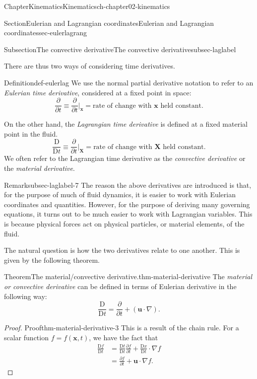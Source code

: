 \documentclass[oneside,10pt,]{book}
\numberwithin{equation}{section}
\newcommand{\DD}[2]{\frac{\mathrm{D}#1}{\mathrm{D}#2}}
\newcommand{\pd}[2]{\frac{\partial#1}{\partial#2}}
\newcommand{\bx}{\boldsymbol{x}}
\newcommand{\bX}{\boldsymbol{X}}
\newcommand{\bu}{\boldsymbol{u}}
\begin{document}
\begin{chapterptx}{Chapter}{Kinematics}{}{Kinematics}{}{}{ch-chapter02-kinematics}
\begin{sectionptx}{Section}{Eulerian and Lagrangian coordinates}{}{Eulerian and Lagrangian coordinates}{}{}{sec-eulerlagrang}
\begin{subsectionptx}{Subsection}{The convective derivative}{}{The convective derivative}{}{}{subsec-laglabel}
\par
There are thus two ways of considering time derivatives.%
\begin{definition}{Definition}{}{}{def-eulerlag}%
We use the normal partial derivative notation to refer to an \emph{Eulerian time derivative}, considered at a fixed point in space:%
\begin{equation*}
\pd{}{t} \equiv \pd{}{t} \biggr\rvert_{\bx} = \text{rate of change with $\bx$ held
constant}.
\end{equation*}
%
\par
On the other hand, the \emph{Lagrangian time derivative} is defined at a fixed material point in the fluid.%
\begin{equation*}
\DD{}{t} \equiv \pd{}{t} \biggr\rvert_{\bX} = \text{rate of change with $\bX$ held
constant}.
\end{equation*}
We often refer to the Lagrangian time derivative as the \emph{convective derivative} or the \emph{material derivative}.%
\end{definition}
\begin{remark}{Remark}{}{subsec-laglabel-7}%
The reason the above derivatives are introduced is that, for the purpose of much of fluid dynamics, it is easier to work with Eulerian coordinates and quantities. However, for the purpose of deriving many governing equations, it turns out to be much easier to work with Lagrangian variables. This is because physical forces act on physical particles, or material elements, of the fluid.%
\end{remark}
The natural question is how the two derivatives relate to one another. This is given by the following theorem.%
\begin{theorem}{Theorem}{The material\slash{}convective derivative.}{}{thm-material-derivative}%
The \emph{material or convective derivative} can be defined in terms of Eulerian derivative in the following way:%
\begin{equation}
\DD{}{t} = \pd{}{t} + (\bu \cdot \nabla).\label{eqn-DDt}
\end{equation}
%
\end{theorem}
\begin{proof}{Proof}{}{thm-material-derivative-3}
This is a result of the chain rule. For a scalar function \(f = f(\bx, t)\), we have the fact that%
\begin{align*}
\DD{f}{t} &= \DD{t}{t} \pd{f}{t} + \DD{x}{t}\cdot \nabla f \\
&= \pd{f}{t} + \bu \cdot \nabla f. 
\end{align*}

\end{proof}
\end{subsectionptx}
\end{sectionptx}
\end{chapterptx}
\end{document}
